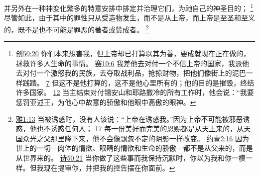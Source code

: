 \documentclass[12pt, a4paper, oneside]{ctexart}
\begin{document}
	并另外在一种神变化繁多的特意安排中排定并治理它们，为祂自己的神圣目的；
	\footnote {
		\href{https://biblehub.com/genesis/50-20.htm}{创50:20} 你们本来想害我，但上帝却已打算以其为善，要成就现在正在做的，拯救许多人生命的事情。
		\href{https://biblehub.com/isaiah/10-6.htm}{赛10:6} 我差他去对付一个不信上帝的国家，我派他去对付一个激怒我的民族，去夺取战利品，抢掠财物，把他们像街上的泥巴一样践踏。
		\href{https://biblehub.com/isaiah/10-7.htm}{7} 但这不是他打算的，这不是他心里所有的；他的目的是摧毁，终结许多国家。
		\href{https://biblehub.com/isaiah/10-12.htm}{12} 当主结束对付锡安山和耶路撒冷的所有工作时，他会说：“我要惩罚亚述王，为他心中故意的骄傲和他眼中高傲的眼神。
	}
	尽管如此，由于其中的罪性只从受造物发生，而不是从上帝，而上帝是至圣和至义的，既不是也不可能是罪恶的著者或赞成者。
	\footnote {
		\href{https://biblehub.com/james/1-13.htm}{雅1:13} 当被诱惑时，没有人该说：“上帝在诱惑我。”因为上帝不可能被邪恶诱惑，他也不诱惑任何人；
		\href{https://biblehub.com/james/1-17.htm}{17} 每一份美好而完美的恩赐都是从天上来的，从天国众光之父那里降下来，他不会像飘忽不定的阴影一样改变。
		\href{https://biblehub.com/1_john/2-16.htm}{约壹2:16} 因为世上的一切---肉体的情欲、眼睛的情欲和生命的骄傲---都不是从父来的，而是从世界来的。
		\href{https://biblehub.com/psalms/50-21.htm}{诗50:21} 当你做了这些事而我保持沉默时，你以为我和你一模一样。但我现在提审你，并把我的控告摆在你面前。
	}
\end{document}
